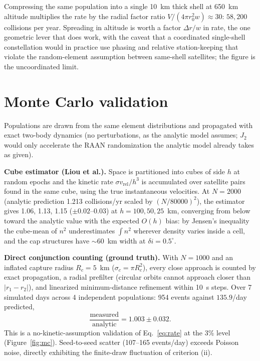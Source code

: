 \documentclass[11pt,a4paper]{article}
\newcommand{\vrel}{v_{\mathrm{rel}}}
\begin{document}
Compressing the same population into a single 10~km thick shell at 650~km altitude
multiplies the rate by the radial factor ratio
$V/(4\pi r_0^2 w) \approx 30$: $58{,}200$ collisions per year. Spreading in altitude
is worth a factor $\Delta r / w$ in rate, the one geometric lever that does work, with
the caveat that a coordinated single-shell constellation would in practice use phasing
and relative station-keeping that violate the random-element assumption between
same-shell satellites; the figure is the uncoordinated limit.

\section{Monte Carlo validation}

Populations are drawn from the same element distributions and propagated with exact
two-body dynamics (no perturbations, as the analytic model assumes; $J_2$ would only
accelerate the RAAN randomization the analytic model already takes as given).

\textbf{Cube estimator (Liou et al.).} Space is partitioned into cubes of side $h$ at
random epochs and the kinetic rate $\sigma \vrel / h^3$ is accumulated over satellite
pairs found in the same cube, using the true instantaneous velocities. At $N = 2000$
(analytic prediction 1.213 collisions/yr scaled by $(N/80000)^2$), the estimator gives
1.06, 1.13, 1.15 ($\pm 0.02$--$0.03$) at $h = 100, 50, 25$~km, converging from below
toward the analytic value with the expected $O(h)$ bias: by Jensen's inequality the
cube-mean of $n^2$ underestimates $\int n^2$ wherever density varies inside a cell,
and the cap structures have $\sim 60$~km width at $\delta i = 0.5^\circ$.

\textbf{Direct conjunction counting (ground truth).} With $N = 1000$ and an inflated
capture radius $R_c = 5$~km ($\sigma_c = \pi R_c^2$), every close approach is counted
by exact propagation, a radial prefilter (circular orbits cannot approach closer than
$|r_1 - r_2|$), and linearized minimum-distance refinement within 10~s steps. Over 7
simulated days across 4 independent populations: 954 events against
$135.9$/day predicted,
\begin{equation}
\frac{\text{measured}}{\text{analytic}} = 1.003 \pm 0.032 .
\end{equation}
This is a no-kinetic-assumption validation of Eq.~\eqref{eq:rate} at the 3\% level
(Figure~\ref{fig:mc}). Seed-to-seed scatter (107--165 events/day) exceeds Poisson
noise, directly exhibiting the finite-draw fluctuation of criterion (ii).
\end{document}
